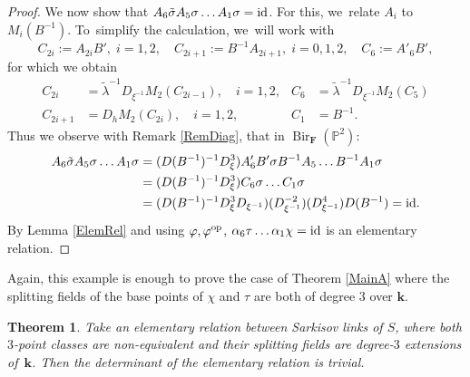 \documentclass[JEP,XML,SOM,Unicode,NoFloatCountersInSection, NoEqCountersInSection,published]{cedram}
\newcommand{\id}{\textup{id}}
\newcommand{\op}{\textup{op}}
\newtheorem{theorem}{Theorem}[section]
\theoremstyle{definition}
\newcommand{\kk}{{\boldsymbol{k}}}
\newcommand{\FF}{{\boldsymbol{F}}}
\DeclareMathOperator{\Bir}{Bir}
\begin{document}
\begin{proof}
We now show that $A_6 \tilde \sigma A_5 \sigma \dots A_1 \sigma = \id$. For this, we~relate $A_i$ to $M_i(B^{-1})$. To~simplify the calculation, we~will work with
\[
C_{2i} := A_{2i} B', \;i = 1,2,\quad C_{2i + 1} := B^{-1} A_{2i + 1}, \;i = 0,1,2, \quad C_{6} := A'_{6} B',
\]
for which we obtain
\begin{align*}
C_{2i} &= \tilde \lambda^{-1} D_{\xi^{-1}} M_2(C_{2i -1}), \quad i = 1,2,& C_{6} &= \tilde \lambda^{-1} D_{\xi^{-1}} M_2(C_{5})
\\
C_{2i + 1} &= D_h M_2(C_{2i}), \quad i=1,2, & C_1 &= B^{-1}.
\end{align*}
Thus we observe with Remark \ref{RemDiag}, that in $\Bir_{\FF}(\mathbb{P}^2)$:
\begin{align*}
A_6 \tilde \sigma A_5 \sigma \dots A_1 \sigma &= (D(B^{-1})^{-1}D_{\xi}^3) A'_6 B' \sigma B^{-1} A_5 \dots B^{-1}A_1 \sigma
\\
&= (D(B^{-1})^{-1}D_{\xi}^3) C_6\sigma \dots C_1 \sigma\\
&= (D(B^{-1})^{-1}D_{\xi}^3 D_{\xi^{-1}}) (D_{\xi^{-1}}^{-2}) (D_{\xi^{-1}}^4) D(B^{-1}) = \id.
\end{align*}
By Lemma \ref{ElemRel} and using $\varphi, \varphi^{\op}$, $\alpha_6 \tau \dots \alpha_1 \chi = \id$ is an elementary relation.
\end{proof}

Again, this example is enough to prove the case of Theorem \ref{MainA} where the splitting fields of the base points of $\chi$ and $\tau$ are both of degree $3$ over $\kk$.

\begin{theorem} \label{thm: elrel2}
Take an elementary relation between Sarkisov links of $S$, where both $3$\nobreakdash-point classes are non-equivalent and their splitting fields are degree-$3$ extensions of~$\kk$. Then the determinant of the elementary relation is trivial.
\end{theorem}
\end{document}
